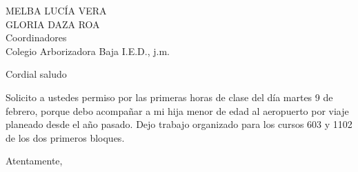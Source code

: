 \documentclass[letterpaper,spanish]{letter}
\begin{document}
\begin{letter}{MELBA LUCÍA VERA\\GLORIA DAZA ROA\\Coordinadores\\Colegio Arborizadora Baja I.E.D., j.m.}
	
\opening{Cordial saludo}
Solicito a ustedes permiso por las primeras horas de clase del día martes 9 de febrero, porque debo acompañar a mi hija menor de edad al aeropuerto por viaje planeado desde el año pasado. Dejo trabajo organizado para los cursos 603 y 1102 de los dos primeros bloques.
\closing{Atentamente,}


\end{letter}
\end{document}
